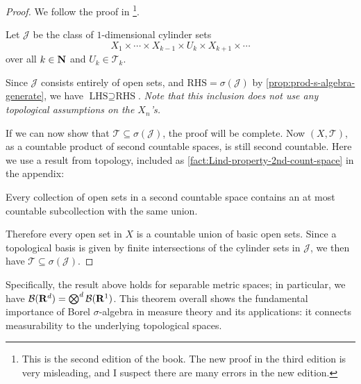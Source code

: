 \begin{proof}
    We follow the proof in \cite{Kallenberg_2002}\footnote{This is the second edition of the book. The new proof in the third edition is very misleading, and I suspect there are many errors in the new edition.}.
    
    Let $\mathcal{J}$ be the class of $1$-dimensional cylinder sets \[
        X_1\times \dotsb \times X_{k-1} \times U_k \times X_{k+1} \times \dotsb
    \] over all $k \in \mathbf{N}$ and $U_k \in \mathcal{T}_k$.
    
    Since $\mathcal{J}$ consists entirely of open sets, and $\text{RHS} = \sigma(\mathcal{J})$ by \cref{prop:prod-s-algebra-generate}, we have $\text{LHS} \supseteq \text{RHS}$. \emph{Note that this inclusion does not use any topological assumptions on the $X_n$'s.}
    
    If we can now show that $\mathcal{T} \subseteq \sigma(\mathcal{J})$, the proof will be complete. Now $(X,\mathcal{T})$, as a countable product of second countable spaces, is still second countable. Here we use a result from topology, included as \cref{fact:Lind-property-2nd-count-space} in the appendix:
    
    \begin{center}
    \noindent\begin{minipage}[t]{0.9\columnwidth}
        Every collection of open sets in a second countable space contains an at most countable subcollection with the same union.
    \end{minipage}
    \end{center}
    
    Therefore every open set in $X$ is a countable union of basic open sets. Since a topological basis is given by finite intersections of the cylinder sets in $\mathcal{J}$, we then have $\mathcal{T} \subseteq \sigma(\mathcal{J})$.
\end{proof}

Specifically, the result above holds for separable metric spaces; in particular, we have $\mathcal{B}(\mathbf{R}^d) = \bigotimes^d \mathcal{B}(\mathbf{R}^1)$. This theorem overall shows the fundamental importance of Borel $\sigma$-algebra in measure theory and its applications: it connects measurability to the underlying topological spaces.

